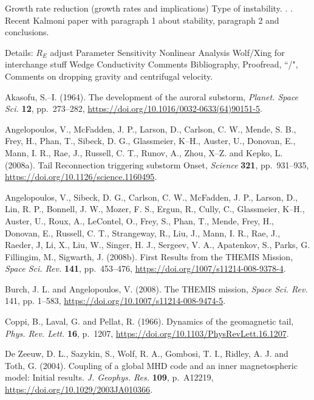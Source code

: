 \documentclass[a4paper,openany,12pt]{book}
\begin{document}
Growth rate reduction (growth rates and implications) Type of instability. . . Recent Kalmoni paper with paragraph 1 about stability, paragraph 2 and conclusions.

Details: $R_E$ adjust Parameter Sensitivity Nonlinear Analysis Wolf/Xing for interchange stuff Wedge Conductivity Comments Bibliography, Proofread, ``/", Comments on dropping gravity and centrifugal velocity.

\begin{thebibliography}{100}

\bibitem{}
Akasofu, S.--I. (1964). The development of the auroral substorm, \emph{Planet. Space Sci.} \textbf{12}, pp.~273--282, \url{https://doi.org/10.1016/0032-0633(64)90151-5}.

\bibitem{}
Angelopoulos, V., McFadden, J. P., Larson, D., Carlson, C. W., Mende, S. B., Frey, H., Phan, T., Sibeck, D. G., Glassmeier, K--H., Auster, U., Donovan, E., Mann, I. R., Rae, J., Russell, C. T., Runov, A., Zhou, X--Z. and Kepko, L. (2008a). Tail Reconnection triggering substorm Onset, \emph{Science} \textbf{321}, pp.~931--935, \url{https://doi.org/10.1126/science.1160495}.

\bibitem{}
Angelopoulos, V., Sibeck, D. G., Carlson, C. W., McFadden, J. P., Larson, D., Lin, R. P., Bonnell, J. W., Mozer, F. S., Ergun, R., Cully, C., Glassmeier, K--H., Auster, U., Roux, A., LeContel, O., Frey, S., Phan, T., Mende, Frey, H., Donovan, E., Russell, C. T., Strangeway, R., Liu, J., Mann, I. R., Rae, J., Raeder, J, Li, X., Liu, W., Singer, H. J., Sergeev, V. A., Apatenkov, S., Parks, G. Fillingim, M., Sigwarth, J. (2008b). First Results from the THEMIS Mission, \emph{Space Sci. Rev.} \textbf{141}, pp.~453--476, \url{https://doi.org/1007/s11214-008-9378-4}.

\bibitem{}
Burch, J. L. and Angelopoulos, V. (2008). The THEMIS mission, 
\emph{Space Sci. Rev.} 141, pp. 1--583, \url{https://doi.org/10.1007/s11214-008-9474-5}.

\bibitem{}
Coppi, B., Laval, G. and Pellat, R. (1966). Dynamics of the geomagnetic tail, \emph{Phys. Rev. Lett.} \textbf{16}, p.~1207, \url{https://doi.org/10.1103/PhysRevLett.16.1207}.

\bibitem{}
De Zeeuw, D. L., Sazykin, S., Wolf, R. A., Gombosi, T. I., Ridley, A. J. and Toth, G. (2004). Coupling of a global MHD code and an inner magnetospheric model: Initial results. \emph{J. Geophys. Res.} \textbf{109}, p.~A12219,
\url{https://doi.org/10.1029/2003JA010366}.


\end{thebibliography}
\end{document}
